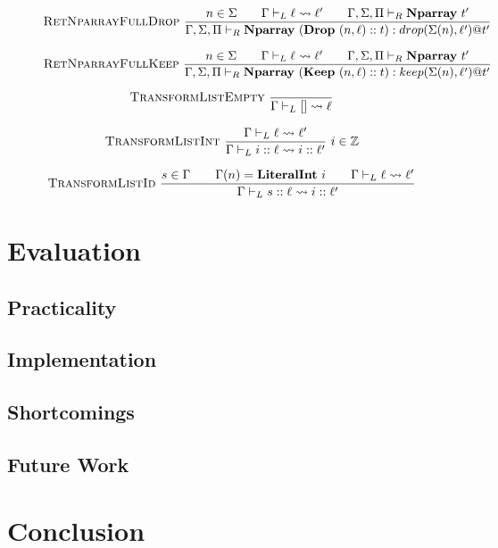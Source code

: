 \documentclass{article}
\begin{document}
\begin{figure}
    $$\textsc{RetNparrayFullDrop}~\frac{n \in \Sigma \qquad \Gamma \vdash_L \ell \rightsquigarrow \ell' \qquad \Gamma, \Sigma, \Pi \vdash_R \textbf{Nparray}~t'}{\Gamma, \Sigma, \Pi \vdash_R \textbf{Nparray}~(\textbf{Drop}~(n, \ell) :: t) : drop(\Sigma(n), \ell') @ t'}$$

    $$\textsc{RetNparrayFullKeep}~\frac{n \in \Sigma \qquad \Gamma \vdash_L \ell \rightsquigarrow \ell' \qquad \Gamma, \Sigma, \Pi \vdash_R \textbf{Nparray}~t'}{\Gamma, \Sigma, \Pi \vdash_R \textbf{Nparray}~(\textbf{Keep}~(n, \ell) :: t) : keep(\Sigma(n), \ell') @ t'}$$

    $$\textsc{TransformListEmpty}~\frac{}{\Gamma \vdash_L [] \rightsquigarrow \ell}$$

    $$\textsc{TransformListInt}~\frac{\Gamma \vdash_L \ell \rightsquigarrow \ell'}{\Gamma \vdash_L i :: \ell \rightsquigarrow i :: \ell'}~i \in \mathbb Z$$

    $$\textsc{TransformListId}~\frac{s \in \Gamma \qquad \Gamma(n) = \textbf{LiteralInt}~i \qquad \Gamma \vdash_L \ell \rightsquigarrow \ell'}{\Gamma \vdash_L s :: \ell \rightsquigarrow i :: \ell'}$$



\end{figure}



\section{Evaluation}

\subsection{Practicality}

\subsection{Implementation}

\subsection{Shortcomings}

\subsection{Future Work}

\section{Conclusion}
\end{document}
